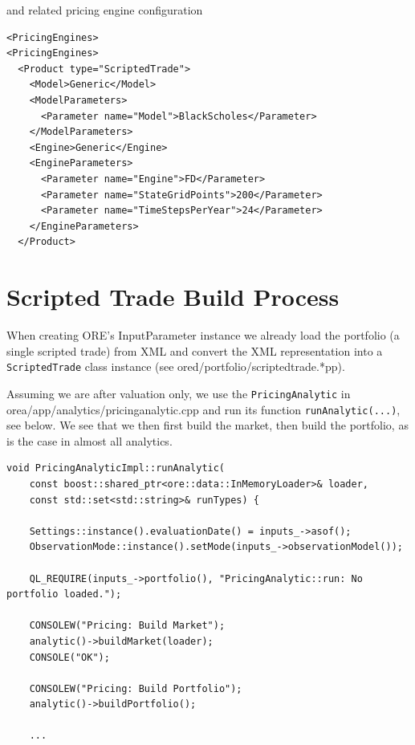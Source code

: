 \documentclass[12pt, a4paper]{report}
\begin{document}
and related pricing engine configuration

\begin{verbatim}
<PricingEngines>
<PricingEngines>
  <Product type="ScriptedTrade">
    <Model>Generic</Model>
    <ModelParameters>
      <Parameter name="Model">BlackScholes</Parameter>
    </ModelParameters>
    <Engine>Generic</Engine>
    <EngineParameters>
      <Parameter name="Engine">FD</Parameter>
      <Parameter name="StateGridPoints">200</Parameter>
      <Parameter name="TimeStepsPerYear">24</Parameter>
    </EngineParameters>
  </Product>
\end{verbatim}

\section{Scripted Trade Build Process}

When creating ORE's InputParameter instance we already load the portfolio (a single
scripted trade) from XML and convert the XML representation into a {\tt ScriptedTrade}
class instance (see ored/portfolio/scriptedtrade.*pp). 

Assuming we are after valuation only, we use the {\tt PricingAnalytic} in
orea/app/analytics/pricinganalytic.cpp and run its function {\tt runAnalytic(...)}, see below.
We see that we then first build the market, then build the portfolio, as is the case in almost
all analytics.

\begin{verbatim}
void PricingAnalyticImpl::runAnalytic( 
    const boost::shared_ptr<ore::data::InMemoryLoader>& loader, 
    const std::set<std::string>& runTypes) {

    Settings::instance().evaluationDate() = inputs_->asof();
    ObservationMode::instance().setMode(inputs_->observationModel());

    QL_REQUIRE(inputs_->portfolio(), "PricingAnalytic::run: No portfolio loaded.");

    CONSOLEW("Pricing: Build Market");
    analytic()->buildMarket(loader);
    CONSOLE("OK");

    CONSOLEW("Pricing: Build Portfolio");
    analytic()->buildPortfolio();

    ...
\end{verbatim}
\end{document}
